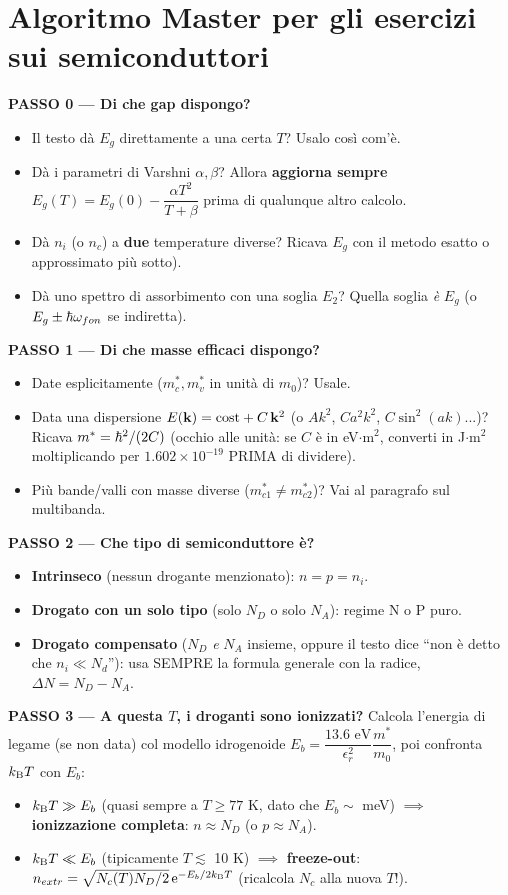 \section{Algoritmo Master per gli esercizi sui semiconduttori}

\textbf{PASSO 0 --- Di che gap dispongo?}
\begin{itemize}
  \item Il testo dà $E_g$ direttamente a una certa $T$? Usalo così com'è.
  \item Dà i parametri di Varshni $\alpha,\beta$? Allora \textbf{aggiorna sempre} $E_g(T)=E_g(0)-\dfrac{\alpha T^2}{T+\beta}$ prima di qualunque altro calcolo.
  \item Dà $n_i$ (o $n_c$) a \textbf{due} temperature diverse? Ricava $E_g$ con il metodo esatto o approssimato pi\`u sotto).
  \item Dà uno spettro di assorbimento con una soglia $E_2$? Quella soglia \emph{è} $E_g$ (o $E_g\pm\hbar\omega_{fon}$ se indiretta).
\end{itemize}

\textbf{PASSO 1 --- Di che masse efficaci dispongo?}
\begin{itemize}
  \item Date esplicitamente ($m_c^*,m_v^*$ in unità di $m_0$)? Usale.
  \item Data una dispersione $E(\mathbf{k})=\text{cost}+C\,\mathbf{k}^2$ (o $Ak^2$, $Ca^2k^2$, $C\sin^2(ak)$...)? Ricava $m^*=\hbar^2/(2C)$ (occhio alle unità: se $C$ è in eV$\cdot$m$^2$, converti in J$\cdot$m$^2$ moltiplicando per $1.602\times10^{-19}$ PRIMA di dividere).
  \item Più bande/valli con masse diverse ($m_{c1}^*\neq m_{c2}^*$)? Vai al paragrafo sul multibanda.
\end{itemize}

\textbf{PASSO 2 --- Che tipo di semiconduttore è?}
\begin{itemize}
  \item \textbf{Intrinseco} (nessun drogante menzionato): $n=p=n_i$.
  \item \textbf{Drogato con un solo tipo} (solo $N_D$ o solo $N_A$): regime N o P puro.
  \item \textbf{Drogato compensato} ($N_D$ \emph{e} $N_A$ insieme, oppure il testo dice ``non è detto che $n_i\ll N_d$''): usa SEMPRE la formula generale con la radice, $\Delta N=N_D-N_A$.
\end{itemize}

\textbf{PASSO 3 --- A questa $T$, i droganti sono ionizzati?}
Calcola l'energia di legame (se non data) col modello idrogenoide $E_b=\dfrac{13.6\text{ eV}}{\epsilon_r^2}\dfrac{m^*}{m_0}$, poi confronta $k_{\mathrm{B}} T$ con $E_b$:
\begin{itemize}
  \item $k_{\mathrm{B}} T\gg E_b$ (quasi sempre a $T\ge 77$ K, dato che $E_b\sim$ meV) $\implies$ \textbf{ionizzazione completa}: $n\approx N_D$ (o $p\approx N_A$).
  \item $k_{\mathrm{B}} T\ll E_b$ (tipicamente $T\lesssim$ 10 K) $\implies$ \textbf{freeze-out}: $n_{extr}=\sqrt{N_c(T)N_D/2}\,\mathrm{e}^{-E_b/2k_{\mathrm{B}} T}$ (ricalcola $N_c$ alla nuova $T$!).
\end{itemize}

